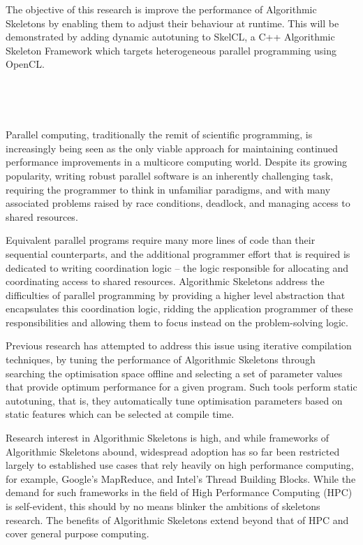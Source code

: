 The objective of this research is improve the performance of
Algorithmic Skeletons by enabling them to adjust their behaviour at
runtime. This will be demonstrated by adding dynamic autotuning to
SkelCL, a C++ Algorithmic Skeleton Framework which targets
heterogeneous parallel programming using OpenCL.

~\cite{Cole1989, Cole2004}

~\cite{Dean2008}
~\cite{IntelTBB}

Parallel computing, traditionally the remit of scientific programming,
is increasingly being seen as the only viable approach for maintaining
continued performance improvements in a multicore computing world.
Despite its growing popularity, writing robust parallel software is an
inherently challenging task, requiring the programmer to think in
unfamiliar paradigms, and with many associated problems raised by race
conditions, deadlock, and managing access to shared resources.

Equivalent parallel programs require many more lines of code than
their sequential counterparts, and the additional programmer effort
that is required is dedicated to writing coordination logic -- the
logic responsible for allocating and coordinating access to shared
resources. Algorithmic Skeletons address the difficulties of parallel
programming by providing a higher level abstraction that encapsulates
this coordination logic, ridding the application programmer of these
responsibilities and allowing them to focus instead on the
problem-solving logic.

Previous research has attempted to address this issue using iterative
compilation techniques, by tuning the performance of Algorithmic
Skeletons through searching the optimisation space offline and
selecting a set of parameter values that provide optimum performance
for a given program. Such tools perform static autotuning, that is,
they automatically tune optimisation parameters based on static
features which can be selected at compile time.

Research interest in Algorithmic Skeletons is high, and while
frameworks of Algorithmic Skeletons abound, widespread adoption has so
far been restricted largely to established use cases that rely heavily
on high performance computing, for example, Google's MapReduce, and
Intel's Thread Building Blocks. While the demand for such frameworks
in the field of High Performance Computing (HPC) is self-evident, this
should by no means blinker the ambitions of skeletons research. The
benefits of Algorithmic Skeletons extend beyond that of HPC and cover
general purpose computing.

